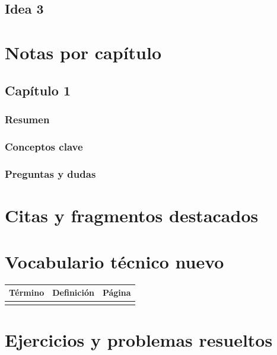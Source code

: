 \subsection{Idea 3}\label{idea-3}

\section{Notas por capítulo}\label{notas-por-capuxedtulo}

\subsection{Capítulo 1}\label{capuxedtulo-1}

\subsubsection{Resumen}\label{resumen}

\subsubsection{Conceptos clave}\label{conceptos-clave}

\subsubsection{Preguntas y dudas}\label{preguntas-y-dudas}

\section{Citas y fragmentos destacados}\label{citas-y-fragmentos-destacados}

\section{Vocabulario técnico nuevo}\label{vocabulario-tuxe9cnico-nuevo}

{\def\LTcaptype{none} %
\begin{longtable}[]{@{}lll@{}}
\toprule\noalign{}
Término & Definición & Página \\
\midrule\noalign{}
\endhead
\bottomrule\noalign{}
\endlastfoot
& & \\
\end{longtable}
}

\section{Ejercicios y problemas resueltos}\label{ejercicios-y-problemas-resueltos}

